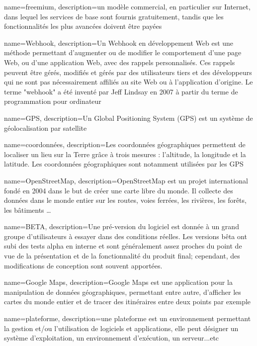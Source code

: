 \makeglossaries
 
{
    name=freemium,
    description={un modèle commercial, en particulier sur Internet, dans lequel les services de base sont fournis gratuitement, tandis que les fonctionnalités les plus avancées doivent être payées}
}

{
    name=Webhook,
    description={Un Webhook en développement Web est une méthode permettant d’augmenter ou de modifier le comportement d’une page Web, ou d’une application Web, avec des rappels personnalisés. Ces rappels peuvent être gérés, modifiés et gérés par des utilisateurs tiers et des développeurs qui ne sont pas nécessairement affiliés au site Web ou à l'application d'origine. Le terme "webhook" a été inventé par Jeff Lindsay en 2007 à partir du terme de programmation pour ordinateur\cite{noauthor_webhook_2019}}
}

{
    name=GPS,
    description={Un Global Positioning System (GPS) est un système de géolocalisation par satellite}
}

{
    name=coordonnées,
    description={Les coordonnées géographiques permettent de localiser un lieu sur la Terre grâce à trois mesures : l'altitude, la longitude et la latitude. Les coordonnées géographiques sont notamment utilisées par les GPS}
}

{
    name=OpenStreetMap,
    description={OpenStreetMap est un projet international fondé en 2004 dans le but de créer une carte libre du monde. Il collecte des données dans le monde entier sur les routes, voies ferrées, les rivières, les forêts, les bâtiments …}
}

{
	name=BETA,
	description={Une pré-version du logiciel est donnée à un grand groupe d’utilisateurs à essayer dans des conditions réelles. Les versions bêta ont subi des tests alpha en interne et sont généralement assez proches du point de vue de la présentation et de la fonctionnalité du produit final; cependant, des modifications de conception sont souvent apportées.\cite{noauthor_beta_nodate}}
}

{
    name=Google Maps,
    description={Google Maps est une application pour la manipulation de données géographiques, permettant entre autre, d'afficher les cartes du monde entier et de tracer des itinéraires entre deux points par exemple}
}

{
    name=plateforme,
    description={une plateforme est un environnement permettant la gestion et/ou l'utilisation de logiciels et applications, elle peut désigner un système d'exploitation, un environnement d'exécution, un serveur...etc}
}

